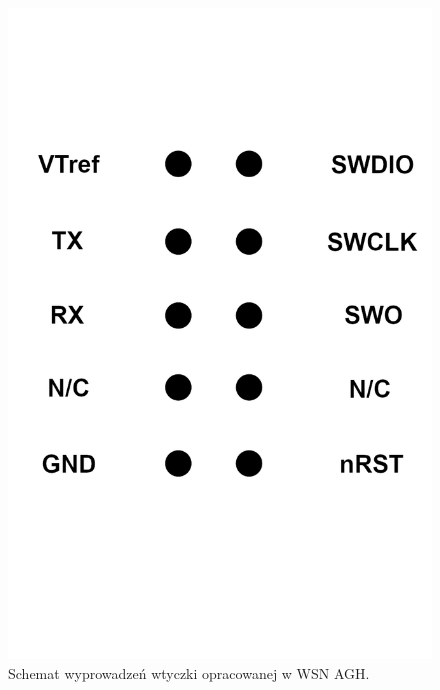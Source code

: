\begin{figure}[H]
  \centering
  \begin{minipage}[b]{0.4\textwidth}
    \centering
    \includegraphics[height=0.4\paperwidth]{images/WSN_plug.png}
    \caption{Schemat wyprowadzeń wtyczki opracowanej w WSN AGH.}
    \label{WSN_Connector}
  \end{minipage}
  \hfill
  \begin{minipage}[b]{0.4\textwidth}
    \centering

\end{minipage}
\end{figure}

